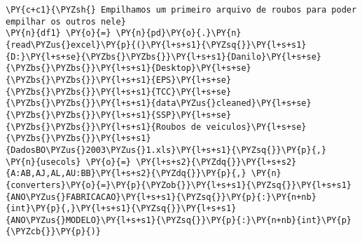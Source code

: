    \begin{tcolorbox}[breakable, size=fbox, boxrule=1pt, pad at break*=1mm,colback=cellbackground, colframe=cellborder]
\begin{Verbatim}[commandchars=\\\{\}]
\PY{c+c1}{\PYZsh{} Empilhamos um primeiro arquivo de roubos para poder empilhar os outros nele}
\PY{n}{df1} \PY{o}{=} \PY{n}{pd}\PY{o}{.}\PY{n}{read\PYZus{}excel}\PY{p}{(}\PY{l+s+s1}{\PYZsq{}}\PY{l+s+s1}{D:}\PY{l+s+se}{\PYZbs{}\PYZbs{}}\PY{l+s+s1}{Danilo}\PY{l+s+se}{\PYZbs{}\PYZbs{}}\PY{l+s+s1}{Desktop}\PY{l+s+se}{\PYZbs{}\PYZbs{}}\PY{l+s+s1}{EPS}\PY{l+s+se}{\PYZbs{}\PYZbs{}}\PY{l+s+s1}{TCC}\PY{l+s+se}{\PYZbs{}\PYZbs{}}\PY{l+s+s1}{data\PYZus{}cleaned}\PY{l+s+se}{\PYZbs{}\PYZbs{}}\PY{l+s+s1}{SSP}\PY{l+s+se}{\PYZbs{}\PYZbs{}}\PY{l+s+s1}{Roubos de veiculos}\PY{l+s+se}{\PYZbs{}\PYZbs{}}\PY{l+s+s1}{DadosBO\PYZus{}2003\PYZus{}1.xls}\PY{l+s+s1}{\PYZsq{}}\PY{p}{,} \PY{n}{usecols} \PY{o}{=} \PY{l+s+s2}{\PYZdq{}}\PY{l+s+s2}{A:AB,AJ,AL,AU:BB}\PY{l+s+s2}{\PYZdq{}}\PY{p}{,} \PY{n}{converters}\PY{o}{=}\PY{p}{\PYZob{}}\PY{l+s+s1}{\PYZsq{}}\PY{l+s+s1}{ANO\PYZus{}FABRICACAO}\PY{l+s+s1}{\PYZsq{}}\PY{p}{:}\PY{n+nb}{int}\PY{p}{,}\PY{l+s+s1}{\PYZsq{}}\PY{l+s+s1}{ANO\PYZus{}MODELO}\PY{l+s+s1}{\PYZsq{}}\PY{p}{:}\PY{n+nb}{int}\PY{p}{\PYZcb{}}\PY{p}{)}
\end{Verbatim}
\end{tcolorbox}

